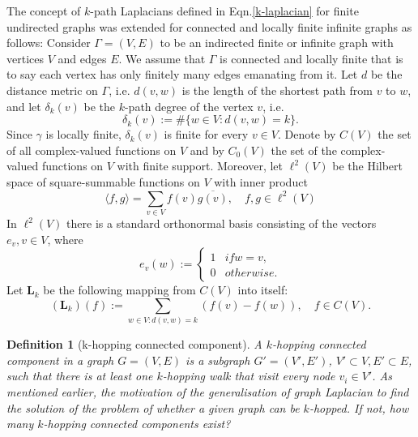 \documentclass[10pt,a4paper]{article}
\newtheorem{defn}{Definition}
\begin{document}
    	    The concept of $k$-path Laplacians defined in Eqn.\ref{k-laplacian} for finite undirected graphs was extended for connected and locally finite infinite graphs as follows:
    	    Consider $\Gamma = (V,E)$ to be an indirected finite or infinite graph with vertices $V$ and edges $E$. We assume that $\Gamma$ is connected and locally finite that is to say each vertex has only finitely many edges emanating from it. Let $d$ be the distance metric on $\Gamma$, i.e. $d(v,w)$ is the length of the shortest path from $v$ to $w$, and let $\delta_{k}(v)$ be the $k$-path degree of the vertex $v$, i.e.
    	    \begin{equation}
    	    \delta_{k}(v) := \#\{w \in V : d(v,w) = k\}.
    	    \end{equation}
    	    Since $\gamma$ is locally finite, $\delta_{k}(v)$ is finite for every $v \in V$. Denote by $C(V)$ the set of all complex-valued functions on $V$ and by $C_{0}(V)$ the set of the complex-valued functions on $V$ with finite support. Moreover, let $\ell^2(V)$ be the Hilbert space of square-summable functions on $V$ with inner product
    	    \begin{equation}
    	    \langle f,g\rangle = \sum_{v\in V} f(v) \overline{g(v)}, \quad f,g \in \ell^2(V) 
    	    \end{equation}
    	    In $\ell^2(V)$ there is a standard orthonormal basis consisting of the vectors $e_v, v\in V$, where
    	    \begin{equation}
    	    e_v(w) :=  \begin{cases*}
    	    1 & if  w = v,  \\
    	    0 & otherwise.
    	    \end{cases*}
    	    \end{equation}
    	    Let $\mathbf{L}_{k}$ be the following mapping from $C(V)$ into itself:
    	    \begin{equation}
    	    (\mathbf{L}_{k}) (f) := \sum_{w\in V: d(v,w)=k} (f(v) -f(w)), \quad f \in C(V).
    	    \label{infinite-dif}
    	    \end{equation}
    	    
    	    
    	    \begin{defn}[k-hopping connected component]
    	    	A $k$-hopping connected component in a graph $G=(V,E)$ is a subgraph $G' = (V',E')$, $V'\subset V,E' \subset E$, such that there is at least one $k$-hopping walk that visit every node $v_i \in V'$.
    	    	As mentioned earlier, the motivation of the generalisation of graph Laplacian to find the solution of the problem of whether a given graph can be $k$-hopped. If not, how many $k$-hopping connected components exist?\\
    	    \end{defn}
    	    
\end{document}
